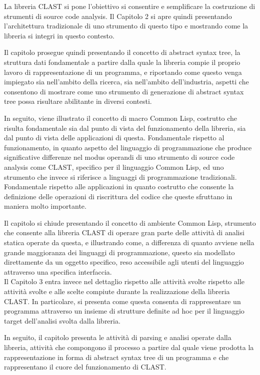 \documentclass{book}
\begin{document}
La libreria CLAST si pone l’obiettivo si consentire e semplificare la
costruzione di strumenti di source code analysis. Il Capitolo 2 si apre quindi
presentando l’architettura tradizionale di uno strumento di questo tipo e
mostrando come la libreria si integri in questo contesto.

Il capitolo prosegue quindi presentando il concetto di abstract syntax tree, la
struttura dati fondamentale a partire dalla quale la libreria compie il proprio
lavoro di rappresentazione di un programma, e riportando come questo venga
impiegato sia nell’ambito della ricerca, sia nell’ambito dell’industria, aspetti
che consentono di mostrare come uno strumento di generazione di abstract syntax
tree possa risultare abilitante in diversi contesti.

In seguito, viene illustrato il concetto di macro Common Lisp, costrutto che
risulta fondamentale sia dal punto di vista del funzionamento della libreria,
sia dal punto di vista delle applicazioni di questa. Fondamentale rispetto al
funzionamento, in quanto aspetto del linguaggio di programmazione che produce
significative differenze nel modus operandi di uno strumento di source code
analysis come CLAST, specifico per il linguaggio Common Lisp, ed uno strumento
che invece si riferisce a linguaggi di programmazione tradizionali. Fondamentale
rispetto alle applicazioni in quanto costrutto che consente la definizione delle
operazioni di riscrittura del codice che queste sfruttano in maniera molto
importante.

Il capitolo si chiude presentando il concetto di ambiente Common Lisp, strumento
che consente alla libreria CLAST di operare gran parte delle attività di analisi
statica operate da questa, e illustrando come, a differenza di quanto avviene
nella grande maggioranza dei linguaggi di programmazione, questo sia modellato
direttamente da un oggetto specifico, reso accessibile agli utenti del
linguaggio attraverso una specifica interfaccia.\\

Il Capitolo 3 entra invece nel dettaglio rispetto alle attività svolte rispetto
alle attività svolte e alle scelte compiute durante la realizzazione della
libreria CLAST. In particolare, si presenta come questa consenta di
rappresentare un programma attraverso un insieme di strutture definite ad hoc
per il linguaggio target dell’analisi svolta dalla libreria.

In seguito, il capitolo presenta le attività di parsing e analisi operate dalla
libreria, attività che compongono il processo a partire dal quale viene prodotta
la rappresentazione in forma di abstract syntax tree di un programma e che
rappresentano il cuore del funzionamento di CLAST.\\
\end{document}
